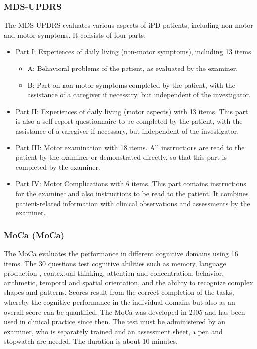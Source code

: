 \subsubsection{\acl{MDS-UPDRS}}
The \ac{MDS-UPDRS} \cite{goetz2007updrs} evaluates various aspects of \ac{iPD}-patients, including non-motor and motor symptoms. It consists of four parts:
\begin{itemize}
\item Part I: Experiences of daily living (non-motor symptoms), including 13 items.
\begin{itemize}
\item A: Behavioral problems of the patient, as evaluated by the examiner.
\item B: Part on non-motor symptoms completed by the patient, with the assistance of a caregiver if necessary, but independent of the investigator.
\end{itemize}
\item Part II: Experiences of daily living (motor aspects) with 13 items. This part is also a self-report questionnaire to be completed by the patient, with the assistance of a caregiver if necessary, but independent of the investigator.
\item Part III: Motor examination with 18 items. All instructions are read to the patient by the examiner or demonstrated directly, so that this part is completed by the examiner.
\item Part IV: Motor Complications with 6 items. This part contains instructions for the examiner and also instructions to be read to the patient. It combines patient-related information with clinical observations and assessments by the examiner.
\end{itemize}

\subsubsection{\acl{MoCa} (\acs{MoCa})}
The \acl{MoCa} evaluates the performance in different cognitive domains using 16 items. The 30 questions test cognitive abilities such as memory, language production , contextual thinking, attention and concentration, behavior, arithmetic, temporal and spatial orientation, and the ability to recognize complex shapes and patterns. Scores result from the correct completion of the tasks, whereby the cognitive performance in the individual domains but also as an overall score can be quantified. The \ac{MoCa} was developed in 2005 \cite{nasreddine2005moca} and has been used in clinical practice since then. The test must be administered by an examiner, who is separately trained and an assessment sheet, a pen and stopwatch are needed. The duration is about 10 minutes.

